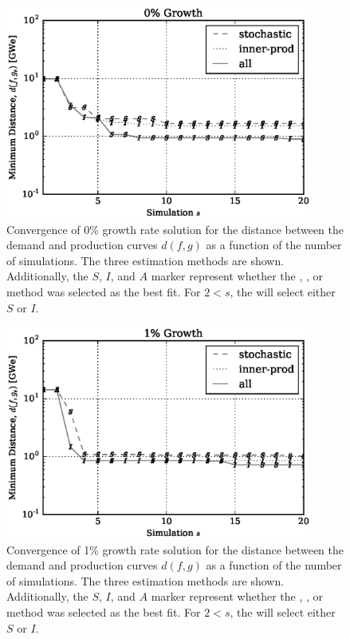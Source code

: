 \begin{figure}[htb]
\centering
\includegraphics[width=0.9\textwidth]{converge-0per.eps}
\caption{Convergence of 0\% growth rate solution for the distance between
the demand and production curves $d(f, g)$ as a function of the number of 
simulations. The three estimation methods are shown. Additionally, the
$S$, $I$, and $A$ marker represent whether the \stochastic, \innerprod, 
or \allflag method was selected as the best fit. For $2 < s$, the \allflag
will select either $S$ or $I$.
}
\label{converge-0per}
\end{figure}

\begin{figure}[htb]
\centering
\includegraphics[width=0.9\textwidth]{converge-1per.eps}
\caption{Convergence of 1\% growth rate solution for the distance between
the demand and production curves $d(f, g)$ as a function of the number of 
simulations. The three estimation methods are shown. Additionally, the
$S$, $I$, and $A$ marker represent whether the \stochastic, \innerprod, 
or \allflag method was selected as the best fit. For $2 < s$, the \allflag
will select either $S$ or $I$.
}
\label{converge-1per}
\end{figure}

